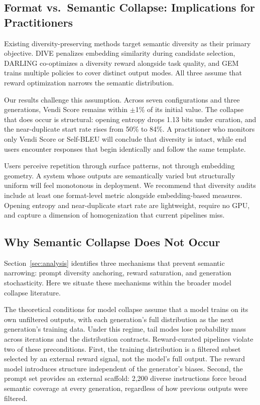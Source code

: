 
\subsection{Format vs.\ Semantic Collapse: Implications for Practitioners}

Existing diversity-preserving methods target semantic diversity as their primary objective. DIVE \cite{placeholder_dive} penalizes embedding similarity during candidate selection, DARLING \cite{placeholder_darling} co-optimizes a diversity reward alongside task quality, and GEM \cite{placeholder_gem} trains multiple policies to cover distinct output modes. All three assume that reward optimization narrows the semantic distribution.

Our results challenge this assumption. Across seven configurations and three generations, Vendi Score remains within $\pm$1\% of its initial value. The collapse that does occur is structural: opening entropy drops 1.13 bits under curation, and the near-duplicate start rate rises from 50\% to 84\%. A practitioner who monitors only Vendi Score or Self-BLEU will conclude that diversity is intact, while end users encounter responses that begin identically and follow the same template.

Users perceive repetition through surface patterns, not through embedding geometry. A system whose outputs are semantically varied but structurally uniform will feel monotonous in deployment. We recommend that diversity audits include at least one format-level metric alongside embedding-based measures. Opening entropy and near-duplicate start rate are lightweight, require no GPU, and capture a dimension of homogenization that current pipelines miss.

\subsection{Why Semantic Collapse Does Not Occur}

Section~\ref{sec:analysis} identifies three mechanisms that prevent semantic narrowing: prompt diversity anchoring, reward saturation, and generation stochasticity. Here we situate these mechanisms within the broader model collapse literature.

The theoretical conditions for model collapse \cite{placeholder_shumailov} assume that a model trains on its own unfiltered outputs, with each generation's full distribution as the next generation's training data. Under this regime, tail modes lose probability mass across iterations and the distribution contracts. Reward-curated pipelines violate two of these preconditions. First, the training distribution is a filtered subset selected by an external reward signal, not the model's full output. The reward model introduces structure independent of the generator's biases. Second, the prompt set provides an external scaffold: 2,200 diverse instructions force broad semantic coverage at every generation, regardless of how previous outputs were filtered.

